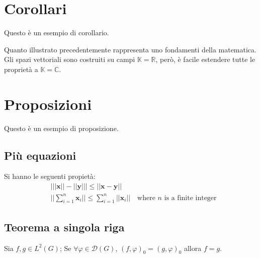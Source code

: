 
\section{Corollari}

Questo è un esempio di corollario.

\begin{corollary}
Quanto illustrato precedentemente rappresenta uno fondamenti della matematica. Gli spazi vettoriali sono costruiti su campi $\mathbb{K}=\mathbb{R}$, però, è facile estendere tutte le proprietà a $\mathbb{K}=\mathbb{C}$.
\end{corollary}


\section{Proposizioni}

Questo è un esempio di proposizione.

\subsection{Più equazioni}

\begin{proposition}
Si hanno le seguenti propietà:
\begin{align}
& \big| ||\mathbf{x}|| - ||\mathbf{y}|| \big|\leq || \mathbf{x}- \mathbf{y}||\\
&  ||\sum_{i=1}^n\mathbf{x}_i||\leq \sum_{i=1}^n||\mathbf{x}_i||\quad\text{where $n$ is a finite integer}
\end{align}
\end{proposition}

\subsection{Teorema a singola riga}

\begin{proposition} 
Sia $f,g\in L^2(G)$; Se $\forall \varphi\in\mathcal{D}(G)$, $(f,\varphi)_0=(g,\varphi)_0$ allora $f = g$. 
\end{proposition}



